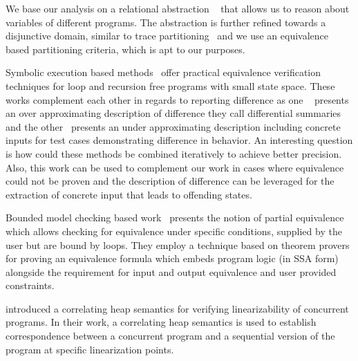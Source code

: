 We base our analysis on a relational abstraction ~\cite{CousotHalbwachs78, Mine07} that allows us to reason about variables of different programs. The abstraction is further refined towards a disjunctive domain, similar to trace partitioning~\cite{MauborgneRival07} and we use an equivalence based partitioning criteria, which is apt to our purposes.

Symbolic execution based methods~\cite{DwyerElbaumPerson08, EnglerRamos11} offer practical equivalence verification techniques for loop and recursion free programs with small state space. These works complement each other in regards to reporting difference as one ~\cite{DwyerElbaumPerson08} presents an over approximating description of difference they call differential summaries and the other~\cite{EnglerRamos11} presents an under approximating description including concrete inputs for test cases demonstrating difference in behavior. An interesting question is how could these methods be combined iteratively to achieve better precision. Also, this work can be used to complement our work in cases where equivalence could not be proven and the description of difference can be leveraged for the extraction of concrete input that leads to offending states.

Bounded model checking based work~\cite{GodlinStrichman09} presents the notion of partial equivalence which allows checking for equivalence under specific conditions, supplied by the user but are bound by loops. They employ a technique based on theorem provers for proving an equivalence formula which embeds program logic (in SSA form) alongside the requirement for input and output equivalence and user provided constraints.

\cite{AmitRinetzkyRepsSagivYahav07} introduced a correlating heap semantics for verifying linearizability of concurrent programs. In their work, a correlating heap semantics is used to establish correspondence between a concurrent program and a sequential version of the program at specific linearization points.  